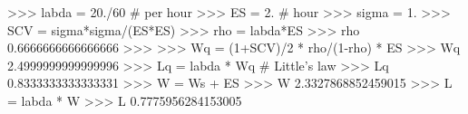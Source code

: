 
>>> labda = 20./60 # per hour
>>> ES = 2. # hour
>>> sigma = 1.
>>> SCV = sigma*sigma/(ES*ES)
>>> rho = labda*ES
>>> rho
0.6666666666666666
>>>
>>> Wq = (1+SCV)/2 * rho/(1-rho) * ES
>>> Wq
2.4999999999999996
>>> Lq = labda * Wq # Little's law
>>> Lq
0.8333333333333331
>>> W = Ws + ES
>>> W
2.3327868852459015
>>> L = labda * W
>>> L
0.7775956284153005

